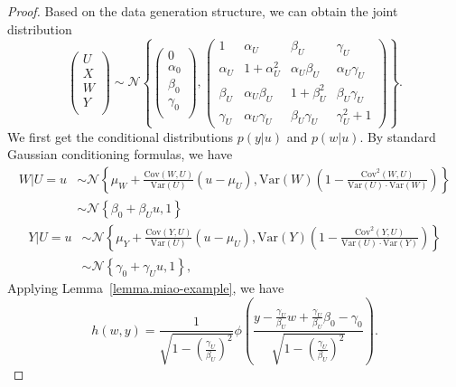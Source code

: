 \documentclass[
  12pt]{article}
\def\cN{\mathcal{N}}
\begin{document}
\begin{proof}
Based on the data generation structure, we can obtain the joint distribution
\begin{equation}\label{eq:joint_normal}
    \left( \begin{array}{c}
	U\\
	X\\
	W\\
	Y\\
\end{array} \right) \sim \cN\left\{ \left( \begin{array}{c}
	0\\
	\alpha_0\\
	\beta_0\\
	\gamma_0\\
\end{array} \right) ,\left( \begin{matrix}
	1&		\alpha_U&		\beta_{U}&		\gamma_U\\
	\alpha_U&		1+\alpha_U^{2}&		\alpha_U\beta_{U}&		\alpha_U\gamma_U\\
	\beta_{U}&		\alpha_U\beta_{U}&		1+\beta_{U}^{2}&		\beta_U\gamma_U\\
	\gamma_U&		\alpha_U\gamma_U&		\beta_U\gamma_U&		\gamma_U^2+1
\end{matrix} \right) \right\}.
\end{equation}
We first get the conditional distributions $p(y|u)$ and $p(w|u)$. By standard Gaussian conditioning formulas, we have
$$
\begin{aligned}
	W|U=u&\sim \cN\left\{ \mu_W+\frac{\mathrm{Cov}(W,U)}{\mathrm{Var}(U)}(u-\mu_{U}),\mathrm{Var}(W)\left( 1-\frac{\mathrm{Cov}^2(W,U)}{\mathrm{Var}(U)\cdot \mathrm{Var}(W)} \right) \right\}\\
	&\sim \cN\left\{ \beta_0+\beta_U u,1\right\} 
\end{aligned}
$$
$$
\begin{aligned}
    Y|U=u&\sim \cN\left\{ \mu_Y+\frac{\mathrm{Cov}(Y,U)}{\mathrm{Var}(U)}(u-\mu_{U}),\mathrm{Var}(Y)\left( 1-\frac{\mathrm{Cov}^2(Y,U)}{\mathrm{Var}(U)\cdot \mathrm{Var}(Y)} \right) \right\} \\
	&\sim \cN\left\{ \gamma_0+\gamma_U u, 1\right\},
\end{aligned}
$$
Applying Lemma~\ref{lemma.miao-example}, we have
$$
h(w,y)=\frac{1}{\sqrt{1-\left( \frac{\gamma_U}{\beta_U} \right)^2}}\phi \left( \frac{y-\frac{\gamma_U}{\beta_U}w+\frac{\gamma_U}{\beta_U}\beta_0-\gamma_0}{\sqrt{1-\left( \frac{\gamma_U}{\beta_U} \right)^2}} \right). 
$$


\end{proof}
\end{document}

